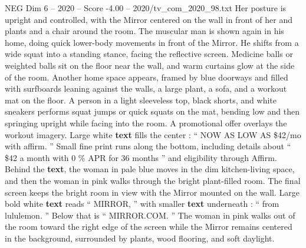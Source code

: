 \begin{textsample}{NEG Dim 6 – 2020 – Score -4.00 – 2020/tv\_com\_2020\_98.txt}
Her posture is upright and controlled, with the Mirror centered on the wall in front of her and plants and a chair around the room.
The muscular man is shown again in his home, doing quick lower-body movements in front of the Mirror.
He shifts from a wide squat into a standing stance, facing the reflective screen.
Medicine balls or weighted balls sit on the floor near the wall, and warm curtains glow at the side of the room.
Another home space appears, framed by blue doorways and filled with surfboards leaning against the walls, a large plant, a sofa, and a workout mat on the floor.
A person in a light sleeveless top, black shorts, and white sneakers performs squat jumps or quick squats on the mat, bending low and then springing upright while facing into the room.
A promotional offer overlays the workout imagery.
Large white \textbf{text} fills the center : “ NOW AS LOW AS \$42/mo with affirm. ” Small fine print runs along the bottom, including details about “ \$42 a month with 0 \% APR for 36 months ” and eligibility through Affirm.
Behind the \textbf{text}, the woman in pale blue moves in the dim kitchen-living space, and then the woman in pink walks through the bright plant-filled room.
The final screen keeps the bright room in view with the Mirror mounted on the wall.
Large bold white \textbf{text} reads “ MIRROR, ” with smaller \textbf{text} underneath : “ from lululemon. ” Below that is “ MIRROR.COM. ” The woman in pink walks out of the room toward the right edge of the screen while the Mirror remains centered in the background, surrounded by plants, wood flooring, and soft daylight.

\end{textsample}
